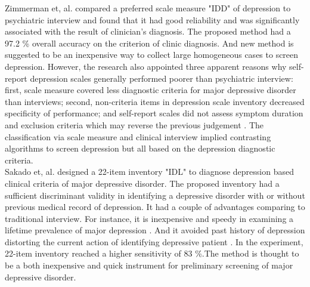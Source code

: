 \documentclass[12pt]{article}
\begin{document}
Zimmerman et, al. \cite{Zimmerman} compared a preferred scale measure "IDD" of depression to psychiatric interview and found that it had good reliability and was significantly associated with the result of clinician's diagnosis. The proposed method had a 97.2 \% \cite{Zimmerman} overall accuracy on the criterion of clinic diagnosis. And new method is suggested to be an inexpensive way to collect large homogeneous cases to screen depression. However, the research also appointed three apparent reasons why self-report depression scales generally performed poorer than psychiatric interview: first, scale measure covered less diagnostic criteria for major depressive disorder than interviews; second, non-criteria items in depression scale inventory decreased specificity of performance; and self-report scales did not assess symptom duration and exclusion criteria which may reverse the previous judgement \cite{Zimmerman}. The classification via scale measure and clinical interview implied contrasting algorithms \cite{Zimmerman} to screen depression but all based on the depression diagnostic criteria. 
\\

Sakado et, al. \cite{Sakado} designed a 22-item inventory "IDL" to diagnose depression based clinical criteria of major depressive disorder. The proposed inventory had a sufficient discriminant validity in identifying a depressive disorder with or without previous medical record of depression. It had a couple of advantages comparing to traditional interview. For instance, it is inexpensive and speedy in examining a lifetime prevalence of major depression \cite{Sakado}. And it avoided past history of depression distorting the current action of identifying depressive patient \cite{Sakado}. In the experiment, 22-item inventory reached a higher sensitivity of 83 \%.The method is thought to be a both inexpensive and quick instrument for preliminary screening of major depressive disorder. 
\\
\end{document}
